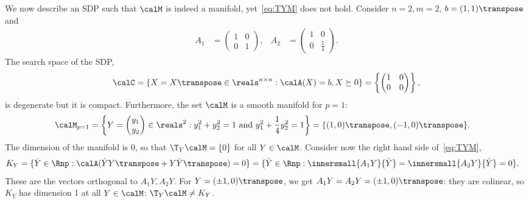 \documentclass{article}
\newcommand{\1}{\mathbf{1}}
\begin{document}
We now describe an SDP such that $\calM$ is indeed a manifold, yet~\eqref{eq:TYM} does not hold. Consider $n = 2, m = 2$, $b = (1, 1)\transpose$ and
\begin{align*}
A_1 & = \begin{pmatrix}
1 & 0 \\ 0 & 1
\end{pmatrix}, & A_2 & = \begin{pmatrix}
1 & 0 \\ 0 & \frac{1}{4}
\end{pmatrix}.
\end{align*}
The search space of the SDP,
\begin{align*}
\calC = \{X = X\transpose \in \reals^{n\times n} : \calA(X) = b, X \succeq 0\} = \left\{ \begin{pmatrix}
1 & 0 \\ 0 & 0
\end{pmatrix} \right\},
\end{align*}
is degenerate but it is compact. Furthermore, the set $\calM$ is a smooth manifold for $p = 1$:
\begin{align*}
\calM_{p=1} & = \left\{ Y = \begin{pmatrix}
y_1 \\ y_2
\end{pmatrix} \in \reals^2 : y_1^2 + y_2^2 = 1 \textrm{ and } y_1^2 + \frac{1}{4}y_2^2 = 1 \right\} = \{ (1, 0)\transpose, (-1, 0)\transpose \}.
\end{align*}
The dimension of the manifold is 0, so that $\T_Y\calM = \{0\}$ for all $Y\in\calM$. Consider now the right hand side of~\eqref{eq:TYM},
\begin{align*}
K_Y & = \{ \dot Y \in \Rnp : \calA(\dot Y Y\transpose + Y \dot Y\transpose) = 0 \} = \{ \dot Y \in \Rnp : \innersmall{A_1Y}{\dot Y} = \innersmall{A_2Y}{\dot Y} = 0 \}.
\end{align*}
These are the vectors orthogonal to $A_1Y, A_2Y$. For $Y = (\pm 1, 0)\transpose$, we get $A_1Y = A_2Y = (\pm 1, 0)\transpose$: they are colinear, so $K_Y$ has dimension 1 at all $Y \in \calM$: $\T_Y\calM \neq K_Y$.
\end{document}
